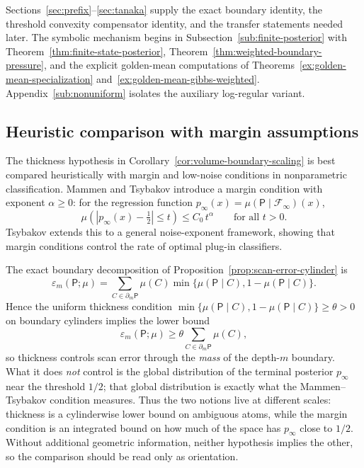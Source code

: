 \documentclass{etds}%
\numberwithin{equation}{section}
\theoremstyle{plain}
\theoremstyle{definition}
\theoremstyle{remark}
\begin{document}
Sections~\ref{sec:prefix}--\ref{sec:tanaka} supply the exact boundary
identity, the threshold convexity compensator identity, and the transfer
statements needed later.  The symbolic mechanism begins in
Subsection~\ref{sub:finite-posterior} with
Theorem~\ref{thm:finite-state-posterior},
Theorem~\ref{thm:weighted-boundary-pressure}, and the explicit golden-mean
computations of
Theorems~\ref{ex:golden-mean-specialization}
and~\ref{ex:golden-mean-gibbs-weighted}.  Appendix~\ref{sub:nonuniform}
isolates the auxiliary log-regular variant.

\subsection{Heuristic comparison with margin assumptions}
\label{sub:margin}

The thickness hypothesis in Corollary~\ref{cor:volume-boundary-scaling} is
best compared heuristically with margin and low-noise conditions in
nonparametric classification.
Mammen and Tsybakov \cite{MammenTsybakov1999} introduce a margin condition
with exponent $\alpha\ge 0$: for the regression function
$p_\infty(x)=\mu(\mathsf{P}\mid\mathcal{F}_\infty)(x)$,
\[
\mu\!\left(\left|p_\infty(x)-\tfrac12\right|\le t\right)\le C_0\,t^\alpha
\qquad\text{for all }t>0.
\]
Tsybakov \cite{Tsybakov2004} extends this to a general noise-exponent
framework, showing that margin conditions control the rate of optimal
plug-in classifiers.

The exact boundary decomposition of Proposition~\ref{prop:scan-error-cylinder}
is
\[
\varepsilon_m(\mathsf{P};\mu)
=\sum_{C\in \partial_m\mathsf{P}}
\mu(C)\min\{\mu(\mathsf{P}\mid C),1-\mu(\mathsf{P}\mid C)\}.
\]
Hence the uniform thickness condition
$\min\{\mu(\mathsf{P}\mid C),1-\mu(\mathsf{P}\mid C)\}\ge\theta>0$ on
boundary cylinders implies the lower bound
\[
\varepsilon_m(\mathsf{P};\mu)\ge
\theta\sum_{C\in\partial_m\mathsf{P}}\mu(C),
\]
so thickness controls scan error through the \emph{mass} of the depth-$m$
boundary.  What it does \emph{not} control is the global distribution of the
terminal posterior $p_\infty$ near the threshold $1/2$; that global
distribution is exactly what the Mammen--Tsybakov condition measures.  Thus
the two notions live at different scales: thickness is a cylinderwise lower
bound on ambiguous atoms, while the margin condition is an integrated bound on
how much of the space has $p_\infty$ close to $1/2$.  Without additional
geometric information, neither hypothesis implies the other, so the comparison
should be read only as orientation.
\end{document}
